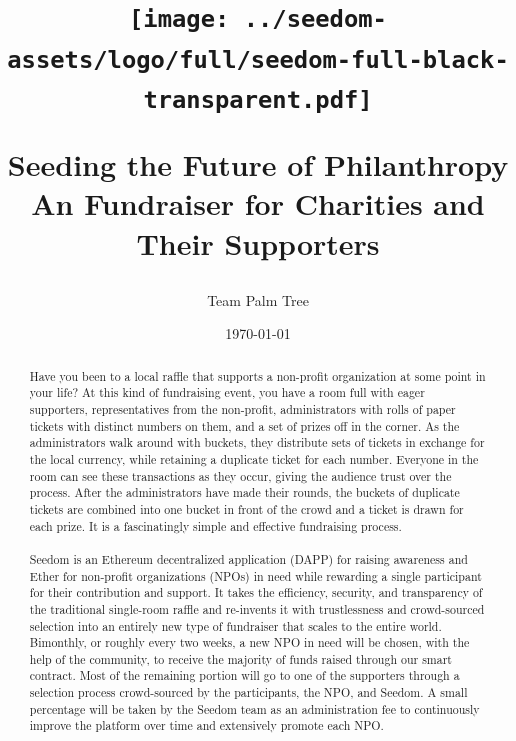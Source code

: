 \documentclass[11pt]{article}
\begin{document}
\title{%
\begin{center}
\texttt{[image: ../seedom-assets/logo/full/seedom-full-black-transparent.pdf]}
\end{center}
\large Seeding the Future of Philanthropy \\[1mm]
\large An Fundraiser for Charities and Their Supporters \\[1mm]}
\author{Team Palm Tree}
\date{\today}
\maketitle

\begin{abstract}

Have you been to a local raffle that supports a non-profit organization at some point in your life? At this kind of fundraising event, you have a room full with eager supporters, representatives from the non-profit, administrators with rolls of paper tickets with distinct numbers on them, and a set of prizes off in the corner. As the administrators walk around with buckets, they distribute sets of tickets in exchange for the local currency, while retaining a duplicate ticket for each number. Everyone in the room can see these transactions as they occur, giving the audience trust over the process. After the administrators have made their rounds, the buckets of duplicate tickets are combined into one bucket in front of the crowd and a ticket is drawn for each prize. It is a fascinatingly simple and effective fundraising process.\\\\
Seedom is an Ethereum decentralized application (DAPP) for raising awareness and Ether for non-profit organizations (NPOs) in need while rewarding a single participant for their contribution and support. It takes the efficiency, security, and transparency of the traditional single-room raffle and re-invents it with trustlessness and crowd-sourced selection into an entirely new type of fundraiser that scales to the entire world. Bimonthly, or roughly every two weeks, a new NPO in need will be chosen, with the help of the community, to receive the majority of funds raised through our smart contract. Most of the remaining portion will go to one of the supporters through a selection process crowd-sourced by the participants, the NPO, and Seedom. A small percentage will be taken by the Seedom team as an administration fee to continuously improve the platform over time and extensively promote each NPO.

\end{abstract}
\pagebreak
\end{document}
